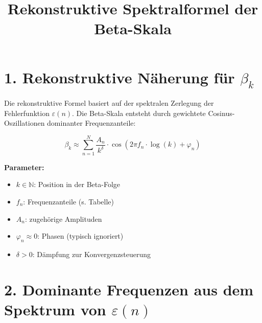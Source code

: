 \documentclass{article}
\title{Rekonstruktive Spektralformel der Beta-Skala}
\author{}
\date{}
\begin{document}
\maketitle

\section*{1. Rekonstruktive Näherung für \boldmath$\beta_k$}

Die rekonstruktive Formel basiert auf der spektralen Zerlegung der Fehlerfunktion \(\varepsilon(n)\). Die Beta-Skala entsteht durch gewichtete Cosinus-Oszillationen dominanter Frequenzanteile:

\[
\beta_k \approx \sum_{n=1}^{N} \frac{A_n}{k^\delta} \cdot \cos\left(2\pi f_n \cdot \log(k) + \varphi_n \right)
\]

\noindent\textbf{Parameter:}
\begin{itemize}
  \item \(k \in \mathbb{N}\): Position in der Beta-Folge
  \item \(f_n\): Frequenzanteile (s. Tabelle)
  \item \(A_n\): zugehörige Amplituden
  \item \(\varphi_n \approx 0\): Phasen (typisch ignoriert)
  \item \(\delta > 0\): Dämpfung zur Konvergenzsteuerung
\end{itemize}

\section*{2. Dominante Frequenzen aus dem Spektrum von \boldmath$\varepsilon(n)$}
\end{document}
